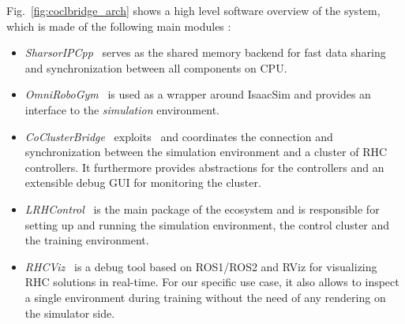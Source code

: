 Fig.~\ref{fig:coclbridge_arch} shows a high level software overview of the system, which is made of the following main modules :
\begin{itemize}
	\item \textit{SharsorIPCpp}~\cite{mystuff::sharsoripcpp} serves as the shared memory backend for fast data sharing and synchronization between all components on CPU.
	\item \textit{OmniRoboGym}~\cite{mystuff::omnirobogym} is used as a wrapper around IsaacSim and provides an interface to the \textit{simulation} environment.
	\item \textit{CoClusterBridge}~\cite{mystuff::coclusterbridge} exploits~\cite{mystuff::sharsoripcpp} and coordinates the connection and synchronization between the simulation environment and a cluster of RHC controllers. It furthermore provides abstractions for the controllers and an extensible debug GUI for monitoring the cluster.
	\item \textit{LRHControl}~\cite{mystuff::lrhccontrol} is the main package of the ecosystem and is responsible for setting up and running the simulation environment, the control cluster and the training environment.
	\item \textit{RHCViz}~\cite{mystuff::rhcviz} is a debug tool based on ROS1/ROS2 and RViz for visualizing RHC solutions in real-time. For our specific use case, it also allows to inspect a single environment during training without the need of any rendering on the simulator side.
\end{itemize}




